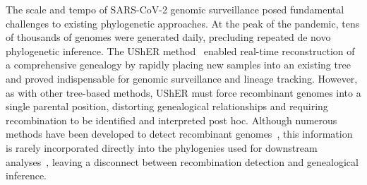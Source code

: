 \documentclass[12pt]{article}
\begin{document}
The scale and tempo of SARS-CoV-2 genomic surveillance posed fundamental
challenges to existing phylogenetic approaches. At the peak of the pandemic,
tens of thousands of genomes were generated daily, precluding repeated de novo
phylogenetic inference. The UShER method~\cite{Turakhia2021} enabled real-time
reconstruction of a comprehensive genealogy by rapidly placing new samples into
an existing tree and proved indispensable for genomic surveillance and lineage
tracking\cite{Hinrichs2024}.
However, as with other tree-based methods, UShER must force
recombinant genomes into a single parental position, distorting genealogical
relationships and requiring recombination to be identified and interpreted post
hoc. Although numerous methods have been developed to detect recombinant
genomes~\cite{Varabyou2021rapid,%
Turakhia2022,%
Zhou2023virusrecom,
Alfonsi2024,%
Li2024CovRecomb},
this information is rarely incorporated directly into the phylogenies
used for downstream analyses~\cite{McBroome2021,Hadfield2018},
leaving a disconnect between recombination
detection and genealogical inference.

\end{document}
